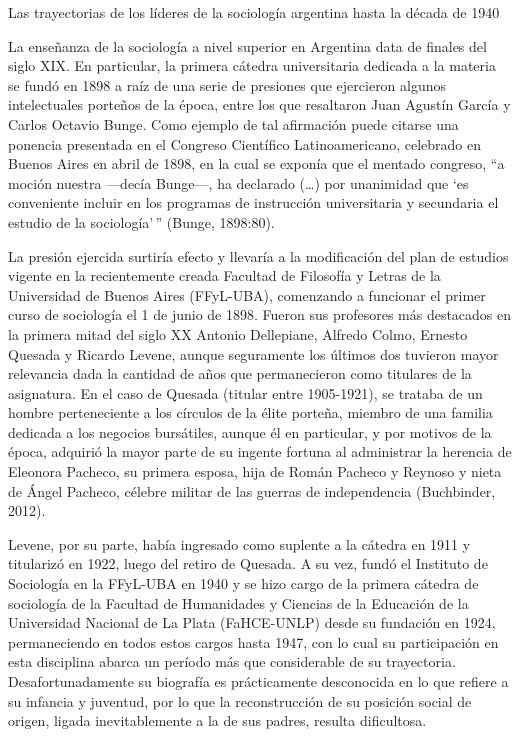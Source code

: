 Las trayectorias de los líderes de la sociología argentina hasta la década de 1940

La enseñanza de la sociología a nivel superior en Argentina data de finales del siglo XIX. En particular, la primera cátedra universitaria dedicada a la materia se fundó en 1898 a raíz de una serie de presiones que ejercieron algunos intelectuales porteños de la época, entre los que resaltaron Juan Agustín García y Carlos Octavio Bunge. Como ejemplo de tal afirmación puede citarse una ponencia presentada en el Congreso Científico Latinoamericano, celebrado en Buenos Aires en abril de 1898, en la cual se exponía que el mentado congreso, ``a moción nuestra ---decía Bunge---, ha declarado (\ldots) por unanimidad que `es conveniente incluir en los programas de instrucción universitaria y secundaria el estudio de la sociología'\,'' (Bunge, 1898:80).

La presión ejercida surtiría efecto y llevaría a la modificación del plan de estudios vigente en la recientemente creada Facultad de Filosofía y Letras de la Universidad de Buenos Aires (FFyL-UBA), comenzando a funcionar el primer curso de sociología el 1 de junio de 1898. Fueron sus profesores más destacados en la primera mitad del siglo XX Antonio Dellepiane, Alfredo Colmo, Ernesto Quesada y Ricardo Levene, aunque seguramente los últimos dos tuvieron mayor relevancia dada la cantidad de años que permanecieron como titulares de la asignatura. En el caso de Quesada (titular entre 1905-1921), se trataba de un hombre perteneciente a los círculos de la élite porteña, miembro de una familia dedicada a los negocios bursátiles, aunque él en particular, y por motivos de la época, adquirió la mayor parte de su ingente fortuna al administrar la herencia de Eleonora Pacheco, su primera esposa, hija de Román Pacheco y Reynoso y nieta de Ángel Pacheco, célebre militar de las guerras de independencia (Buchbinder, 2012).

Levene, por su parte, había ingresado como suplente a la cátedra en 1911 y titularizó en 1922, luego del retiro de Quesada. A su vez, fundó el Instituto de Sociología en la FFyL-UBA en 1940 y se hizo cargo de la primera cátedra de sociología de la Facultad de Humanidades y Ciencias de la Educación de la Universidad Nacional de La Plata (FaHCE-UNLP) desde su fundación en 1924, permaneciendo en todos estos cargos hasta 1947, con lo cual su participación en esta disciplina abarca un período más que considerable de su trayectoria. Desafortunadamente su biografía es prácticamente desconocida en lo que refiere a su infancia y juventud, por lo que la reconstrucción de su posición social de origen, ligada inevitablemente a la de sus padres, resulta dificultosa.

